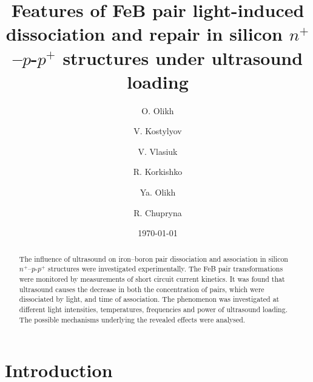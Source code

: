 \documentclass[%
 aip,jap,
 amsmath,amssymb,
 reprint,%
]{revtex4-1}
\begin{document}

\title[FeB transformations under ultrasound loading]{Features of FeB pair light-induced dissociation and repair in silicon $n^+$–$p$-$p^+$ structures under ultrasound loading}
\author{O. Olikh}
\author{V. Kostylyov}%
\author{V. Vlasiuk}
\author{R. Korkishko}
\author{Ya. Olikh}
%

\author{R. Chupryna}


\date{\today}%

\begin{abstract}
The influence of ultrasound on iron--boron pair dissociation and association in silicon $n^+$–$p$-$p^+$ structures were investigated experimentally.
The FeB pair transformations were monitored by measurements of  short circuit current kinetics.
It was found that ultrasound causes the decrease in both the concentration of pairs, which were dissociated by light, and time of association.
The phenomenon was investigated at different light intensities, temperatures, frequencies and power of ultrasound loading.
The possible mechanisms underlying the revealed  effects were analysed.
\end{abstract}

\maketitle


\section{\label{sec:Int}Introduction}
\end{document}
